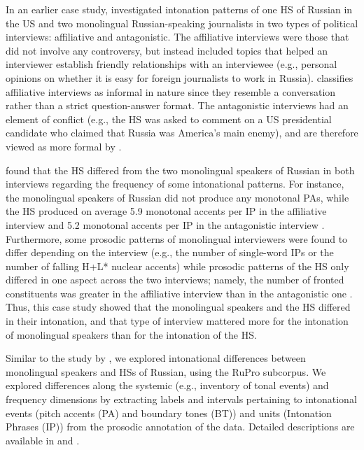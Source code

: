 \documentclass[output=paper,colorlinks,citecolor=brown]{langscibook}
\begin{document}
In an earlier case study, \citet{Comstock_2018} investigated intonation patterns of one HS of Russian in the US and two monolingual Russian-speaking journalists in two types of political interviews: affiliative and antagonistic. The affiliative interviews were those that did not involve any controversy, but instead included topics that helped an interviewer establish friendly relationships with an interviewee (e.g., personal opinions on whether it is easy for foreign journalists to work in Russia). \citet[268]{Comstock_2018} classifies affiliative interviews as informal in nature since they resemble a conversation rather than a strict question-answer format. The antagonistic interviews had an element of conflict (e.g., the HS was asked to comment on a US presidential candidate who claimed that Russia was America’s main enemy), and are therefore viewed as more formal by \citet[268]{Comstock_2018}.

\citet{Comstock_2018} found that the HS differed from the two monolingual speakers of Russian in both interviews regarding the frequency of some intonational patterns. For instance, the monolingual speakers of Russian did not produce any monotonal PAs, while the HS produced on average 5.9 monotonal accents per IP in the affiliative interview and 5.2 monotonal accents per IP in the antagonistic interview \citep[220; 231; 248; 256]{Comstock_2018}. Furthermore, some prosodic patterns of monolingual interviewers were found to differ depending on the interview (e.g., the number of single-word IPs or the number of falling H+L* nuclear accents) while prosodic patterns of the HS only differed in one aspect across the two interviews; namely, the number of fronted constituents was greater in the affiliative interview than in the antagonistic one \citep[267]{Comstock_2018}. Thus, this case study showed that the monolingual speakers and the HS differed in their intonation, and that type of interview mattered more for the intonation of monolingual speakers than for the intonation of the HS.

Similar to the study by \citet{Comstock_2018}, we explored intonational differences between monolingual speakers and HSs of Russian, using the RuPro subcorpus. We explored differences along the systemic (e.g., inventory of tonal events) and frequency dimensions by extracting labels and intervals pertaining to intonational events (pitch accents (PA) and boundary tones (BT)) and units (Intonation Phrases (IP)) from the prosodic annotation of the data. Detailed descriptions are available in \citet{Zerbian_Zuban_Klotz_2024} and \citet{Zuban}.  
\end{document}
